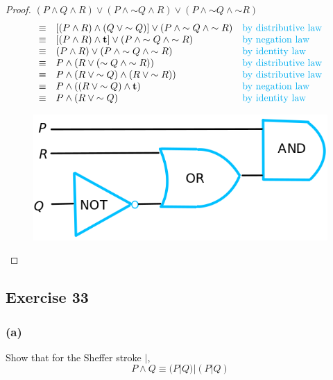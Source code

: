 \documentclass[14pt]{extarticle}
\begin{document}
\begin{proof} $(P \wedge Q \wedge R) \vee (P \wedge {\sim Q} \wedge R) \vee (P
\wedge {\sim Q}\wedge {\sim R})$ $$ \begin{array}{cll} \equiv & [(P \wedge R)
\wedge (Q \vee {\sim Q})] \vee (P \wedge {\sim Q}\wedge {\sim R}) &
\text{\color{cyan}by distributive law} \\ \equiv & [(P \wedge R) \wedge {\bf t}]
\vee (P \wedge {\sim Q}\wedge {\sim R}) & \text{\color{cyan}by negation law} \\
\equiv & (P \wedge R) \vee (P \wedge {\sim Q}\wedge {\sim R}) &
\text{\color{cyan}by identity law} \\ \equiv & P \wedge (R \vee ({\sim Q} \wedge
{\sim R})) & \text{\color{cyan}by distributive law} \\ \equiv & P \wedge (R \vee
{\sim Q}) \wedge (R \vee {\sim R})) & \text{\color{cyan}by distributive law} \\
\equiv & P \wedge ((R \vee {\sim Q}) \wedge {\bf t}) & \text{\color{cyan}by
negation law} \\ \equiv & P \wedge (R \vee {\sim Q}) & \text{\color{cyan}by
identity law} \\ \end{array} $$ \begin{figure}[ht!] \centering
\includegraphics[scale=0.3]{../images/2.4.32.png} \end{figure} \end{proof}

\subsection{Exercise 33} \subsubsection{(a)} Show that for the Sheffer stroke
$|$, $$ P \wedge Q \equiv (P | Q) | (P | Q) $$
\end{document}
